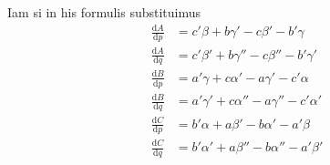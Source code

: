 Iam si in his formulis substituimus
\[
\begin{aligned}
\frac{\mathrm{d}A}{\mathrm{d}p}&=c'\beta+b\gamma'-c\beta'-b'\gamma\\
\frac{\mathrm{d}A}{\mathrm{d}q}&=c'\beta'+b\gamma''-c\beta''-b'\gamma'\\
\frac{\mathrm{d}B}{\mathrm{d}p}&=a'\gamma+c\alpha'-a\gamma'-c'\alpha\\
\frac{\mathrm{d}B}{\mathrm{d}q}&=a'\gamma'+c\alpha''-a\gamma''-c'\alpha'\\
\frac{\mathrm{d}C}{\mathrm{d}p}&=b'\alpha+a\beta'-b\alpha'-a'\beta\\
\frac{\mathrm{d}C}{\mathrm{d}q}&=b'\alpha'+a\beta''-b\alpha''-a'\beta'
\end{aligned}
\]
